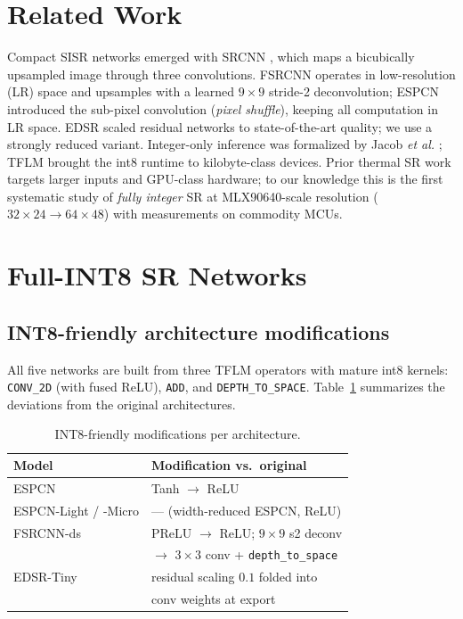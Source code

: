 \documentclass[conference,a4paper]{IEEEtran}
\begin{document}
\section{Related Work}
Compact SISR networks emerged with SRCNN \cite{dong2014srcnn}, which maps a
bicubically upsampled image through three convolutions. FSRCNN
\cite{dong2016fsrcnn} operates in low-resolution (LR) space and upsamples
with a learned $9{\times}9$ stride-2 deconvolution; ESPCN \cite{shi2016espcn}
introduced the sub-pixel convolution (\emph{pixel shuffle}), keeping all
computation in LR space. EDSR \cite{lim2017edsr} scaled residual networks to
state-of-the-art quality; we use a strongly reduced variant. Integer-only
inference was formalized by Jacob \emph{et al.} \cite{jacob2018quantization};
TFLM \cite{david2021tflm} brought the int8 runtime to
kilobyte-class devices. Prior thermal SR work targets larger inputs and
GPU-class hardware; to our knowledge this is the first systematic study of
\emph{fully integer} SR at MLX90640-scale resolution ($32{\times}24
\rightarrow 64{\times}48$) with measurements on commodity MCUs.

\section{Full-INT8 SR Networks}
\subsection{INT8-friendly architecture modifications}
All five networks are built from three TFLM operators with mature int8
kernels: \texttt{CONV\_2D} (with fused ReLU), \texttt{ADD}, and
\texttt{DEPTH\_TO\_SPACE}. Table~\ref{tab:mods} summarizes the deviations
from the original architectures.

\begin{table}[t]
\caption{INT8-friendly modifications per architecture.}
\label{tab:mods}
\centering
\footnotesize
\begin{tabular}{ll}
\toprule
Model & Modification vs.\ original \\
\midrule
ESPCN \cite{shi2016espcn} & Tanh $\rightarrow$ ReLU \\
ESPCN-Light / -Micro & --- (width-reduced ESPCN, ReLU) \\
FSRCNN-ds \cite{dong2016fsrcnn} & PReLU $\rightarrow$ ReLU; $9{\times}9$ s2 deconv \\
 & \quad$\rightarrow$ $3{\times}3$ conv + \texttt{depth\_to\_space} \\
EDSR-Tiny \cite{lim2017edsr} & residual scaling $0.1$ folded into \\
 & \quad conv weights at export \\
\bottomrule
\end{tabular}
\end{table}
\end{document}
